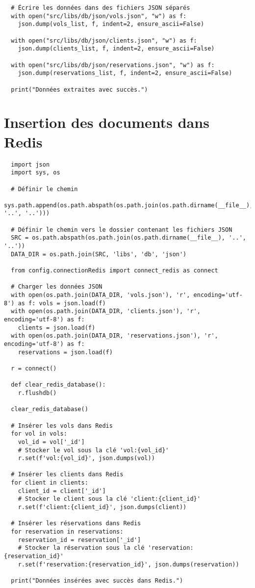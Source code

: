 \begin{verbatim}
  # Écrire les données dans des fichiers JSON séparés
  with open("src/libs/db/json/vols.json", "w") as f:
    json.dump(vols_list, f, indent=2, ensure_ascii=False)
  
  with open("src/libs/db/json/clients.json", "w") as f:
    json.dump(clients_list, f, indent=2, ensure_ascii=False)
  
  with open("src/libs/db/json/reservations.json", "w") as f:
    json.dump(reservations_list, f, indent=2, ensure_ascii=False)
  
  print("Données extraites avec succès.")
\end{verbatim}

\section{Insertion des documents dans Redis}
\label{ann:redis_insert}
\begin{verbatim}
  import json
  import sys, os

  # Définir le chemin 
  sys.path.append(os.path.abspath(os.path.join(os.path.dirname(__file__), '..', '..')))

  # Définir le chemin vers le dossier contenant les fichiers JSON
  SRC = os.path.abspath(os.path.join(os.path.dirname(__file__), '..', '..'))
  DATA_DIR = os.path.join(SRC, 'libs', 'db', 'json')

  from config.connectionRedis import connect_redis as connect

  # Charger les données JSON
  with open(os.path.join(DATA_DIR, 'vols.json'), 'r', encoding='utf-8') as f: vols = json.load(f)
  with open(os.path.join(DATA_DIR, 'clients.json'), 'r', encoding='utf-8') as f:
    clients = json.load(f)
  with open(os.path.join(DATA_DIR, 'reservations.json'), 'r', encoding='utf-8') as f:
    reservations = json.load(f)

  r = connect()

  def clear_redis_database():
    r.flushdb()
    
  clear_redis_database()

  # Insérer les vols dans Redis
  for vol in vols:
    vol_id = vol['_id']
    # Stocker le vol sous la clé 'vol:{vol_id}'
    r.set(f'vol:{vol_id}', json.dumps(vol))

  # Insérer les clients dans Redis
  for client in clients:
    client_id = client['_id']
    # Stocker le client sous la clé 'client:{client_id}'
    r.set(f'client:{client_id}', json.dumps(client))

  # Insérer les réservations dans Redis
  for reservation in reservations:
    reservation_id = reservation['_id']
    # Stocker la réservation sous la clé 'reservation:{reservation_id}'
    r.set(f'reservation:{reservation_id}', json.dumps(reservation))

  print("Données insérées avec succès dans Redis.")
\end{verbatim}

